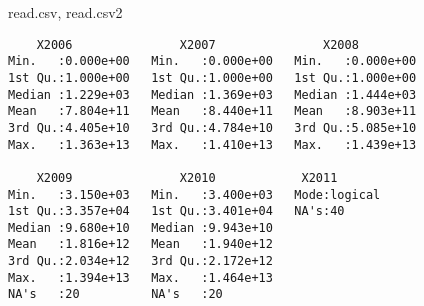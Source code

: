 \documentclass[xcolor={usenames,svgnames,dvipsnames}]{beamer}
\begin{document}
\begin{frame}[fragile,label=sec-2-3]{read.csv, read.csv2}
\begin{verbatim}
    X2006               X2007               X2008          
Min.   :0.000e+00   Min.   :0.000e+00   Min.   :0.000e+00  
1st Qu.:1.000e+00   1st Qu.:1.000e+00   1st Qu.:1.000e+00  
Median :1.229e+03   Median :1.369e+03   Median :1.444e+03  
Mean   :7.804e+11   Mean   :8.440e+11   Mean   :8.903e+11  
3rd Qu.:4.405e+10   3rd Qu.:4.784e+10   3rd Qu.:5.085e+10  
Max.   :1.363e+13   Max.   :1.410e+13   Max.   :1.439e+13  

    X2009               X2010            X2011        
Min.   :3.150e+03   Min.   :3.400e+03   Mode:logical  
1st Qu.:3.357e+04   1st Qu.:3.401e+04   NA's:40       
Median :9.680e+10   Median :9.943e+10                 
Mean   :1.816e+12   Mean   :1.940e+12                 
3rd Qu.:2.034e+12   3rd Qu.:2.172e+12                 
Max.   :1.394e+13   Max.   :1.464e+13                 
NA's   :20          NA's   :20
\end{verbatim}
\end{frame}
\end{document}

